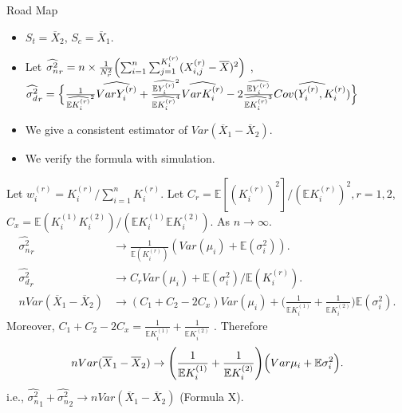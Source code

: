 \documentclass[xcolor=x11names,table]{beamer}
\newcommand{\bbe}{\mathbb{E}}
\newcommand{\wht}{\widehat}
\newcommand{\var}{Var}
\newcommand{\xbar}{\overline{X}}
\newcommand{\naiveest}{\wht{\sigma^2_n}}
\newcommand{\deltaest}{\wht{\sigma^2_d}}
\begin{document}
\begin{frame}{Road Map}
\small
\begin{itemize}
\item $S_t = \xbar_2$, $S_c=\xbar_1$.
\item Let
$
\naiveest_r = n\times \frac{1}{N_r^2} \Bigl (\sum_{i=1}^n \sum_{j=1}^{K_i^{(r)}} (X_{i,j}^{(r)}-\overline{X})^2 \Bigr )
$ ,
$
\deltaest_r =  \Bigl\{ \frac{1}{\wht{\bbe K_i^{(r)}}^2}\wht{\var Y_i^{(r)}} + \frac{\wht{\bbe Y_i^{(r)}}^2}{\wht{\bbe K_i^{(r)}}^4}\wht{\var K_i^{(r)}} - 2\frac{\wht{\bbe Y_i^{(r)}}}{\wht{\bbe K_i^{(r)}}^3} \wht{Cov(Y_i^{(r)},K_i^{(r)})} \Bigr\} 
$
\item We give a consistent estimator of $\var(\xbar_1-\xbar_2)$.
\item We verify the formula with simulation. 
\end{itemize}
\end{frame}

\begin{frame}
\small
\begin{theorem}
Let $w_i^{(r)}=K_i^{(r)}/\sum_{i=1}^{n} K_i^{(r)} $. Let $C_r = \bbe[ (K_i^{(r)})^2] / (\bbe K_i^{(r)})^2,r=1,2$, $C_x = \bbe (K_i^{(1)}K_i^{(2)})/(\bbe K_i^{(1)}\bbe K_i^{(2)})$. As $n\to \infty$. 
\begin{align*}
\naiveest_r &\to  \frac{1}{\bbe(K_i^{(r)})} (\var(\mu_i)+\bbe(\sigma_i^2)). \\
\deltaest_r &\to C_r \var(\mu_i) + \bbe(\sigma^2_i)/\bbe (K_i^{(r)}).\\
  n\var(\xbar_1-\xbar_2) &\to (C_1+C_2-2C_x) \var(\mu_i) + \Biggl(\frac{1}{\bbe K_i^{(1)}}+\frac{1}{\bbe K_i^{(2)}}\Biggr )\bbe(\sigma^2_i).
\end{align*}
Moreover, $C_1+C_2-2C_x= \frac{1}{\bbe K_i^{(1)}}+\frac{1}{\bbe K_i^{(2)}}$ . Therefore
\begin{align*}
n\var(\xbar_1-\xbar_2) \to\Biggl(\frac{1 }{\bbe K_i^{(1)}}+\frac{1}{\bbe K_i^{(2)}}\Biggr) \Bigl( \var \mu_i + \bbe \sigma_i^2\Bigr).
\end{align*}
i.e., \alert{ $\naiveest_1+\naiveest_2 \to n\var(\xbar_1-\xbar_2)$  \quad (Formula X)}.
\end{theorem}
\end{frame}
\end{document}
